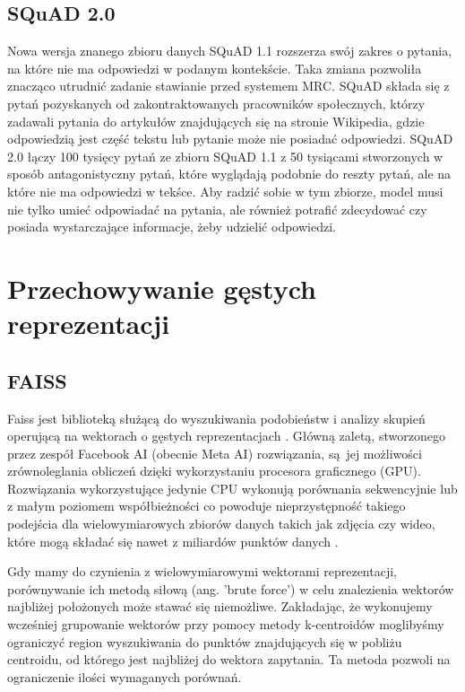 \subsection{SQuAD 2.0}

Nowa wersja znanego zbioru danych SQuAD 1.1 rozszerza swój zakres o pytania, na które nie ma odpowiedzi w podanym kontekście. Taka zmiana pozwoliła znacząco utrudnić zadanie stawianie przed systemem MRC. SQuAD składa się z pytań pozyskanych od zakontraktowanych pracowników społecznych, którzy zadawali pytania do artykułów znajdujących się na stronie Wikipedia, gdzie odpowiedzią jest część tekstu lub pytanie może nie posiadać odpowiedzi. SQuAD 2.0 łączy 100 tysięcy pytań ze zbioru SQuAD 1.1 z 50 tysiącami stworzonych w sposób antagonistyczny pytań, które wyglądają podobnie do reszty pytań, ale na które nie ma odpowiedzi w tekśce. Aby radzić sobie w tym zbiorze, model musi nie tylko umieć odpowiadać na pytania, ale również potrafić zdecydować czy posiada wystarczające informacje, żeby udzielić odpowiedzi.

\section{Przechowywanie gęstych reprezentacji}

\subsection{FAISS}

Faiss jest biblioteką służącą do wyszukiwania podobieństw i analizy skupień operującą na wektorach o gęstych reprezentacjach \autocite{faiss}. Główną zaletą, stworzonego przez zespół Facebook AI (obecnie Meta AI) rozwiązania, są jej możliwości zrównoleglania obliczeń dzięki wykorzystaniu procesora graficznego (GPU). Rozwiązania wykorzystujące jedynie CPU wykonują porównania sekwencyjnie lub z małym poziomem współbieżności co powoduje nieprzystępność takiego podejścia dla wielowymiarowych zbiorów danych takich jak zdjęcia czy wideo, które mogą składać się nawet z miliardów punktów danych \autocite{johnson2019billion}. \newline

Gdy mamy do czynienia z wielowymiarowymi wektorami reprezentacji, porównywanie ich metodą siłową (ang. 'brute force') w celu znalezienia wektorów najbliżej położonych może stawać się niemożliwe. Zakładając, że wykonujemy wcześniej grupowanie wektorów przy pomocy metody k-centroidów moglibyśmy ograniczyć region wyszukiwania do punktów znajdujących się w pobliżu centroidu, od którego jest najbliżej do wektora zapytania. Ta metoda pozwoli na ograniczenie ilości wymaganych porównań. \newline

